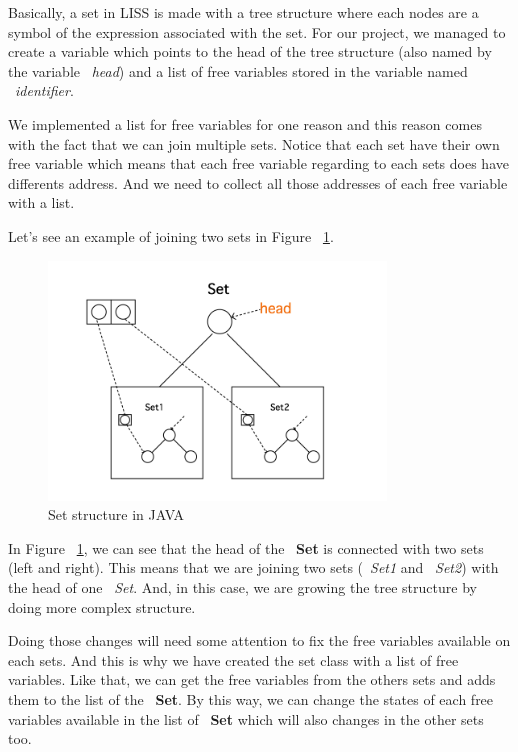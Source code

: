 \documentclass[
  oneside,
  11pt, a4paper,
  footinclude=true,
  headinclude=true,
  cleardoublepage=empty
]{scrbook}
\begin{document}
Basically, a set in LISS is made with a tree structure where each nodes are a symbol of the expression associated with the set.
For our project, we managed to create a variable which points to the head of the tree structure (also named by the variable ~\textit{head}) and a list of free variables stored in the variable named ~\textit{identifier}.

We implemented a list for free variables for one reason and this reason comes with the fact that we can join multiple sets.
Notice that each set have their own free variable which means that each free variable regarding to each sets does have differents address. And we need to collect all those addresses of each free variable with a list.

Let's see an example of joining two sets in Figure ~\ref{fig:sets_associaton}.

\begin{figure}[h!]
 \centering
  \includegraphics[width=0.8\textwidth]{img/sets_association.png}
  \caption{Set structure in JAVA}
  \label{fig:sets_associaton}
\end{figure}

In Figure ~\ref{fig:sets_associaton}, we can see that the head of the ~\textbf{Set} is connected with two sets (left and right). This means that we are joining two sets (~\textit{Set1} and ~\textit{Set2}) with the head of one ~\textit{Set}. And, in this case, we are growing the tree structure by doing more complex structure.

Doing those changes will need some attention to fix the free variables available on each sets. And this is why we have created the set class with a list of free variables. Like that, we can get the free variables from the others sets and adds them to the list of the ~\textbf{Set}. By this way, we can change the states of each free variables available in the list of ~\textbf{Set} which will also changes in the other sets too.
\end{document}
